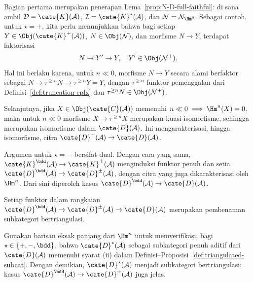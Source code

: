 \begin{bukti}
	Bagian pertama merupakan penerapan Lema~\ref{prop:N-D-full-faithful}:
	di sana ambil $\mathcal{D} = \cate{K}(\mathcal{A})$,
	$\mathcal{I} = \cate{K}^\star(\mathcal{A})$, dan
	$\mathcal{N} = \mathcal{N}_{\Hm^0}$. Sebagai contoh, untuk $\star = +$,
		kita perlu menunjukkan bahwa bagi setiap
	$Y \in \Obj(\cate{K}^+(\mathcal{A}))$, $N \in \Obj(\mathcal{N})$, dan
	morfisme $N \to Y$, terdapat faktorisasi
	\[ N \to Y' \to Y, \quad Y' \in \Obj(\mathcal{N}^+). \]
	Hal ini berlaku karena, untuk $n \ll 0$, morfisme $N \to Y$ secara alami
	berfaktor sebagai
	$N \to \tau^{\geq n} N \to \tau^{\geq n} Y = Y$, dengan
	$\tau^{\geq n}$ funktor pemenggalan dari
	Definisi~\ref{def:truncation-cplx} dan
	$\tau^{\geq n} N \in \Obj(\mathcal{N}^+)$.

	Selanjutnya, jika $X \in \Obj(\cate{C}(\mathcal{A}))$ memenuhi
	$n \ll 0 \implies \Hm^n(X) = 0$, maka untuk $n \ll 0$ morfisme
	$X \to \tau^{\geq n} X$ merupakan kuasi-isomorfisme, sehingga merupakan
	isomorfisme dalam $\cate{D}(\mathcal{A})$. Ini mengarakterisasi, hingga
	isomorfisme, citra $\cate{D}^+(\mathcal{A}) \to \cate{D}(\mathcal{A})$.

	Argumen untuk $\star = -$ bersifat dual. Dengan cara yang sama,
	$\cate{K}^{\bdd}(\mathcal{A}) \to \cate{K}^\pm(\mathcal{A})$ menginduksi
	funktor penuh dan setia
	$\cate{D}^{\bdd}(\mathcal{A}) \to \cate{D}^\pm(\mathcal{A})$, dengan citra
	yang juga dikarakterisasi oleh $\Hm^n$. Dari sini diperoleh kasus
	$\cate{D}^{\bdd}(\mathcal{A}) \to \cate{D}(\mathcal{A})$.
\end{bukti}

\begin{korolari}
	Setiap funktor dalam rangkaian
	$\cate{D}^{\bdd}(\mathcal{A}) \to \cate{D}^{\pm}(\mathcal{A}) \to
	\cate{D}(\mathcal{A})$ merupakan pembenaman subkategori bertriangulasi.
\end{korolari}

\begin{bukti}
	Gunakan barisan eksak panjang dari $\Hm^n$ untuk memverifikasi, bagi
	$\star \in \{+, -, \bdd\}$, bahwa $\cate{D}^\star(\mathcal{A})$ sebagai
	subkategori penuh aditif dari $\cate{D}(\mathcal{A})$ memenuhi syarat (ii)
	dalam Definisi--Proposisi~\ref{def:triangulated-subcat}. Dengan demikian,
	$\cate{D}^\star(\mathcal{A})$ menjadi subkategori bertriangulasi; kasus
	$\cate{D}^{\bdd}(\mathcal{A}) \to \cate{D}^{\pm}(\mathcal{A})$ juga jelas.
\end{bukti}

